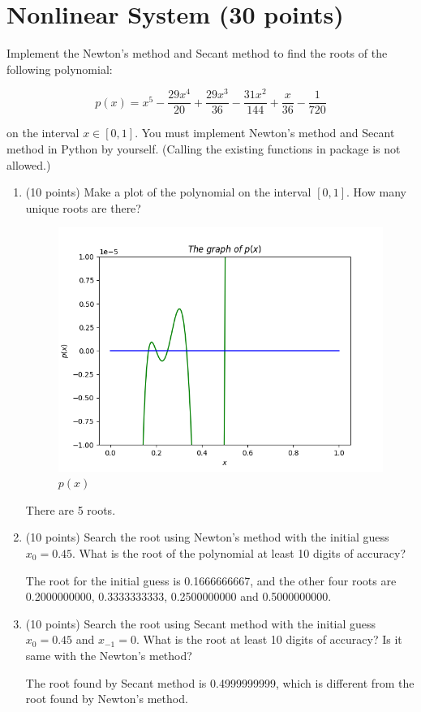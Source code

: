 \documentclass[10pt]{article}
\begin{document}
\section{Nonlinear System (30 points)}
Implement the Newton's method and Secant method to find the roots of the following polynomial:

$$
p(x)=x^{5}-\frac{29 x^{4}}{20}+\frac{29 x^{3}}{36}-\frac{31 x^{2}}{144}+\frac{x}{36}-\frac{1}{720}
$$

on the interval $x \in[0,1]$. 
You must implement Newton's method and Secant method in Python by yourself. 
(Calling the existing functions in package is not allowed.)

\begin{enumerate}[label=4.\arabic*]
    \item (10 points)
    Make a plot of the polynomial on the interval $[0,1]$. How many unique roots are there? \par
   	\begin{figure}[H]
    	\centering
    	\includegraphics[scale=0.7]{./Nonlinear/p(x).png}
    	\caption{$p(x)$}
    \end{figure}
	There are 5 roots.
    \item (10 points)
    Search the root using Newton's method with the initial guess $x_0=0.45$. What is the root of the polynomial at least 10 digits of accuracy?\par
    The root for the initial guess is 0.1666666667, and the other four roots are 0.2000000000, 0.3333333333, 0.2500000000 and 0.5000000000.
    \item (10 points)
    Search the root using Secant method with the initial guess $x_0=0.45$ and $x_{-1}=0$. What is the root at least 10 digits of accuracy? Is it same with the Newton's method?\par
    The root found by Secant method is 0.4999999999, which is different from the root found by Newton's method. 
\end{enumerate}
\end{document}
